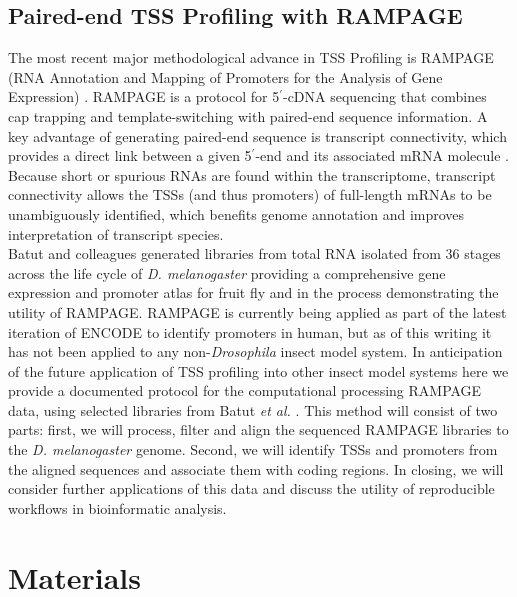 \documentclass[runningheads,a4paper]{llncs}
\begin{document}
\begin{linenumbers}
\subsection{Paired-end TSS Profiling with RAMPAGE}
The most recent major methodological advance in TSS Profiling is RAMPAGE (RNA Annotation and Mapping of Promoters for the Analysis of Gene Expression) \cite{Batut:2012kc,Batut:2013fu}. 
RAMPAGE is a protocol for 5$^\prime$-cDNA sequencing that combines cap trapping and template-switching with paired-end sequence information. 
A key advantage of generating paired-end sequence is transcript connectivity, which provides a direct link between a given 5$^\prime$-end and its associated mRNA molecule \cite{Batut:2012kc}.
Because short or spurious RNAs are found within the transcriptome, transcript connectivity allows the TSSs (and thus promoters) of full-length mRNAs to be unambiguously identified, which benefits genome annotation and improves interpretation of transcript species.
\\
\indent
Batut and colleagues \cite{Batut:2012kc} generated libraries from total RNA isolated from 36 stages across the life cycle of \textit{D. melanogaster} providing a comprehensive gene expression and promoter atlas for fruit fly and in the process demonstrating the utility of RAMPAGE.
RAMPAGE is currently being applied as part of the latest iteration of ENCODE to identify promoters in human, but as of this writing it has not been applied to any non-\textit{Drosophila} insect model system. 
In anticipation of the future application of TSS profiling into other insect model systems here we provide a documented protocol for the computational processing RAMPAGE data, using selected libraries from Batut \textit{et al.} \cite{Batut:2012kc}. 
This method will consist of two parts: first, we will process, filter and align the sequenced RAMPAGE libraries to the \textit{D. melanogaster} genome. 
Second, we will identify TSSs and promoters from the aligned sequences and associate them with coding regions.
In closing, we will consider further applications of this data and discuss the utility of reproducible workflows in bioinformatic analysis.


\section{Materials}


\end{linenumbers}
\end{document}
